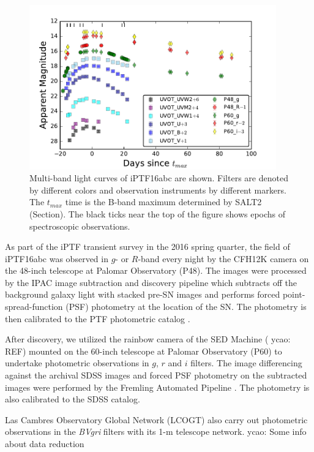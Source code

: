 \documentclass[twocolumn]{aastex61}
\newcommand{\ycao}[1]{{\color{red} ycao: {#1}}}
\begin{document}
\begin{figure}[htb]
  \centering
  \includegraphics[width=0.95\textwidth]{lightcurve.pdf}
  \caption{Multi-band light curves of iPTF16abc are shown. Filters are
    denoted by different colors and observation instruments by
    different markers. The $t_{max}$ time is the B-band maximum
    determined by SALT2 (Section). The black ticks near the top of the
    figure shows epochs of spectroscopic observations.}
  \label{fig:lightcurve}
\end{figure}

As part of the iPTF transient survey in the 2016 spring quarter, the
field of iPTF16abc was observed in $g$- or $R$-band every night by the
CFH12K camera \citep{2000SPIE.3965...58S} on the 48-inch telescope at
Palomar Observatory (P48). The images were processed by the IPAC image
subtraction and discovery pipeline which subtracts off the background
galaxy light with stacked pre-SN images and performs forced
point-spread-function (PSF) photometry at the location of the SN. The
photometry is then calibrated to the PTF photometric catalog
\citep{2012PASP..124..854O}.

After discovery, we utilized the rainbow camera of the SED
Machine (\ycao{REF}) mounted on the 60-inch telescope at Palomar
Observatory (P60) to undertake photometric observations in $g$, $r$
and $i$ filters. The image differencing against the archival SDSS
images and forced PSF photometry on the subtracted images were
performed by the Fremling Automated Pipeline
\citep{2016A&A...593A..68F}. The photometry is also calibrated to the
SDSS catalog.

Las Cambres Observatory Global Network (LCOGT) also carry out photometric
observations in the \textit{BVgri} filters with its 1-m telescope network.
\ycao{Some info about data reduction}
\end{document}
